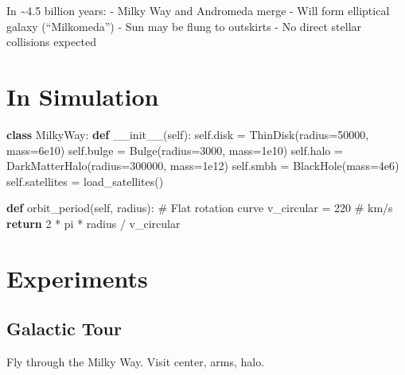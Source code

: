 \documentclass[
  11pt,
  letterpaper,
  twoside,
  openright]{book}
\newenvironment{Shaded}{\begin{snugshade}}{\end{snugshade}}
\newcommand{\CommentTok}[1]{\textcolor[rgb]{0.37,0.37,0.37}{#1}}
\newcommand{\ControlFlowTok}[1]{\textcolor[rgb]{0.00,0.23,0.31}{\textbf{#1}}}
\newcommand{\DecValTok}[1]{\textcolor[rgb]{0.68,0.00,0.00}{#1}}
\newcommand{\FloatTok}[1]{\textcolor[rgb]{0.68,0.00,0.00}{#1}}
\newcommand{\FunctionTok}[1]{\textcolor[rgb]{0.28,0.35,0.67}{#1}}
\newcommand{\KeywordTok}[1]{\textcolor[rgb]{0.00,0.23,0.31}{\textbf{#1}}}
\newcommand{\NormalTok}[1]{\textcolor[rgb]{0.00,0.23,0.31}{#1}}
\newcommand{\OperatorTok}[1]{\textcolor[rgb]{0.37,0.37,0.37}{#1}}
\newcommand{\VariableTok}[1]{\textcolor[rgb]{0.07,0.07,0.07}{#1}}
\begin{document}
In \textasciitilde4.5 billion years: - Milky Way and Andromeda merge -
Will form elliptical galaxy (``Milkomeda'') - Sun may be flung to
outskirts - No direct stellar collisions expected

\section{In Simulation}\label{in-simulation-16}

\begin{Shaded}
\begin{Highlighting}[]
\KeywordTok{class}\NormalTok{ MilkyWay:}
    \KeywordTok{def} \FunctionTok{\_\_init\_\_}\NormalTok{(}\VariableTok{self}\NormalTok{):}
        \VariableTok{self}\NormalTok{.disk }\OperatorTok{=}\NormalTok{ ThinDisk(radius}\OperatorTok{=}\DecValTok{50000}\NormalTok{, mass}\OperatorTok{=}\FloatTok{6e10}\NormalTok{)}
        \VariableTok{self}\NormalTok{.bulge }\OperatorTok{=}\NormalTok{ Bulge(radius}\OperatorTok{=}\DecValTok{3000}\NormalTok{, mass}\OperatorTok{=}\FloatTok{1e10}\NormalTok{)}
        \VariableTok{self}\NormalTok{.halo }\OperatorTok{=}\NormalTok{ DarkMatterHalo(radius}\OperatorTok{=}\DecValTok{300000}\NormalTok{, mass}\OperatorTok{=}\FloatTok{1e12}\NormalTok{)}
        \VariableTok{self}\NormalTok{.smbh }\OperatorTok{=}\NormalTok{ BlackHole(mass}\OperatorTok{=}\FloatTok{4e6}\NormalTok{)}
        \VariableTok{self}\NormalTok{.satellites }\OperatorTok{=}\NormalTok{ load\_satellites()}

    \KeywordTok{def}\NormalTok{ orbit\_period(}\VariableTok{self}\NormalTok{, radius):}
        \CommentTok{\# Flat rotation curve}
\NormalTok{        v\_circular }\OperatorTok{=} \DecValTok{220}  \CommentTok{\# km/s}
        \ControlFlowTok{return} \DecValTok{2} \OperatorTok{*}\NormalTok{ pi }\OperatorTok{*}\NormalTok{ radius }\OperatorTok{/}\NormalTok{ v\_circular}
\end{Highlighting}
\end{Shaded}

\section{Experiments}\label{experiments-26}

\subsection{Galactic Tour}\label{galactic-tour}

Fly through the Milky Way. Visit center, arms, halo.
\end{document}
